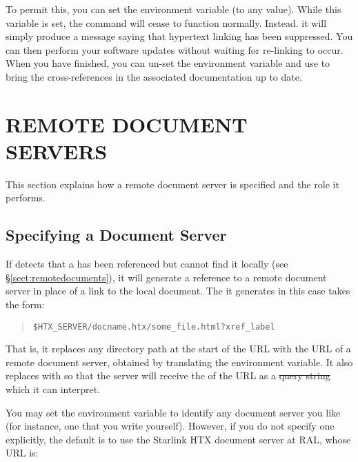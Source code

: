 To permit this, you can set the  environment variable
(to any value). While this variable is set, the  command
will cease to function normally. Instead. it will simply produce a
message saying that hypertext linking has been suppressed. You can
then perform your software updates without waiting for re-linking to
occur. When you have finished, you can un-set the 
environment variable and use  to bring the cross-references
in the associated documentation up to date.

\section{\label{sect:remoteservers}REMOTE
DOCUMENT SERVERS}

This section explains how a remote document server is specified and
the role it performs.

\subsection{\label{sect:specifyingaserver}Specifying a Document Server}

If  detects that a  has been referenced
but cannot find it locally (see \S\ref{sect:remotedocuments}), it will
generate a reference to a remote document server in place of a link to
the local document. The  it generates in this case takes
the form:

\begin{quote}
\begin{verbatim}
$HTX_SERVER/docname.htx/some_file.html?xref_label
\end{verbatim}
\end{quote}

That is, it replaces any directory path at the start of the URL with
the URL of a remote document server, obtained by translating the
 environment variable. It also replaces
 with 
so that the server will receive the  of the URL as
a \st{query string} which it can interpret.

You may set the  environment variable to identify any
document server you like (for instance, one that you write
yourself). However, if you do not specify one explicitly, the default
is to use the Starlink HTX document server at RAL, whose URL is:

